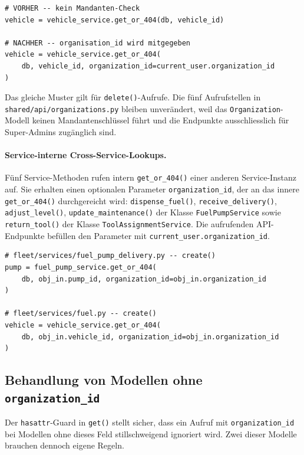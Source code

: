 \begin{lstlisting}[style=custompython, caption={Aufruf-Muster vor und nach dem Patch (Beispiel Fahrzeug-Endpunkt).}]
# VORHER -- kein Mandanten-Check
vehicle = vehicle_service.get_or_404(db, vehicle_id)

# NACHHER -- organisation_id wird mitgegeben
vehicle = vehicle_service.get_or_404(
    db, vehicle_id, organization_id=current_user.organization_id
)
\end{lstlisting}

Das gleiche Muster gilt für \texttt{delete()}-Aufrufe. Die fünf
Aufrufstellen in \texttt{shared/api/\allowbreak organizations.py}
bleiben unverändert, weil das \texttt{Organization}-Modell keinen
Mandantenschlüssel führt und die Endpunkte ausschliesslich für
Super-Admins zugänglich sind.

\paragraph{Service-interne Cross-Service-Lookups.}
Fünf Service-Methoden rufen intern \texttt{get\_or\_404()} einer
anderen Service-Instanz auf. Sie erhalten einen optionalen Parameter
\texttt{organization\_id}, der an das innere \texttt{get\_or\_404()}
durchgereicht wird: \texttt{dispense\_fuel()},
\texttt{receive\_\allowbreak delivery()}, \texttt{adjust\_level()},
\texttt{update\_maintenance()} der Klasse \texttt{FuelPumpService}
sowie \texttt{return\_tool()} der Klasse \texttt{ToolAssignmentService}.
Die aufrufenden API-Endpunkte befüllen den Parameter mit
\texttt{current\_user.\allowbreak organization\_id}.

\begin{lstlisting}[style=custompython, caption={Service-interner Cross-Service-Lookup mit Mandantencheck.}]
# fleet/services/fuel_pump_delivery.py -- create()
pump = fuel_pump_service.get_or_404(
    db, obj_in.pump_id, organization_id=obj_in.organization_id
)

# fleet/services/fuel.py -- create()
vehicle = vehicle_service.get_or_404(
    db, obj_in.vehicle_id, organization_id=obj_in.organization_id
)
\end{lstlisting}

\subsection{Behandlung von Modellen ohne \texttt{organization\_id}}
\label{sec:patch-no-org}

Der \texttt{hasattr}-Guard in \texttt{get()} stellt sicher, dass ein
Aufruf mit \texttt{organization\_id} bei Modellen ohne dieses Feld
stillschweigend ignoriert wird. Zwei dieser Modelle brauchen dennoch
eigene Regeln.

